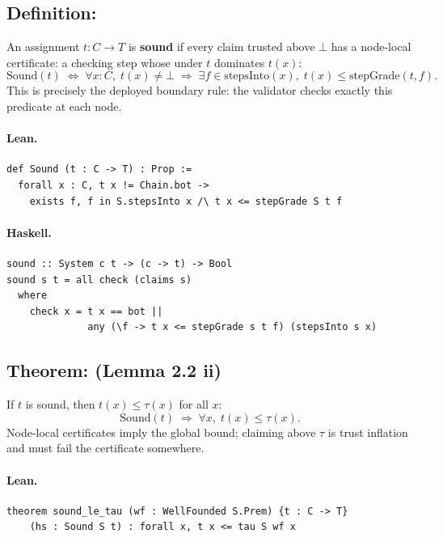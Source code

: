 \documentclass[11pt,a4paper]{article}
\begin{document}
\subsection{Definition: }

\begin{defn}
An assignment $t : C \to T$ is \textbf{sound} if every claim trusted above
$\bot$ has a node-local certificate: a checking step whose 
under $t$ dominates $t(x)$:
\[
  \mathrm{Sound}(t) \;\iff\;
  \forall x : C,\; t(x) \ne \bot \;\Rightarrow\;
  \exists f \in \mathrm{stepsInto}(x),\; t(x) \le \mathrm{stepGrade}(t, f).
\]
This is precisely the deployed boundary rule: the validator checks exactly
this predicate at each node.
\end{defn}

\paragraph{Lean.}
\begin{lstlisting}[style=lean]
def Sound (t : C -> T) : Prop :=
  forall x : C, t x != Chain.bot ->
    exists f, f in S.stepsInto x /\ t x <= stepGrade S t f
\end{lstlisting}

\paragraph{Haskell.}
\begin{lstlisting}[style=haskell]
sound :: System c t -> (c -> t) -> Bool
sound s t = all check (claims s)
  where
    check x = t x == bot ||
              any (\f -> t x <= stepGrade s t f) (stepsInto s x)
\end{lstlisting}


\subsection{Theorem:  (Lemma 2.2 ii)}

\begin{thm}
If $t$ is sound, then $t(x) \le \tau(x)$ for all $x$:
\[
  \mathrm{Sound}(t) \;\Rightarrow\; \forall x,\; t(x) \le \tau(x).
\]
Node-local certificates imply the global bound; claiming above $\tau$ is
trust inflation and must fail the certificate somewhere.
\end{thm}

\paragraph{Lean.}
\begin{lstlisting}[style=lean]
theorem sound_le_tau (wf : WellFounded S.Prem) {t : C -> T}
    (hs : Sound S t) : forall x, t x <= tau S wf x
\end{lstlisting}
\end{document}

